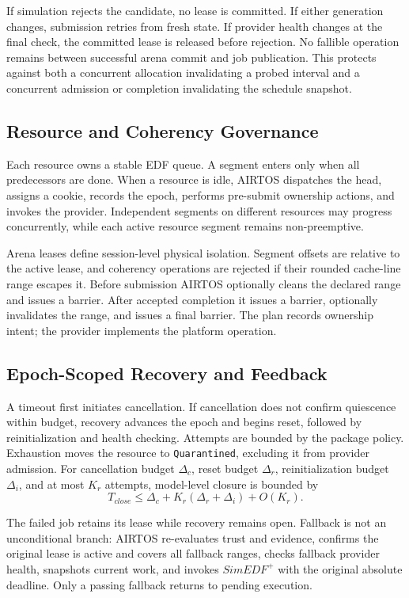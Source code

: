 \documentclass[lettersize,journal]{IEEEtran}
\begin{document}
If simulation rejects the candidate, no lease is committed. If either
generation changes, submission retries from fresh state. If provider health
changes at the final check, the committed lease is released before rejection.
No fallible operation remains between successful arena commit and job
publication. This protects against both a concurrent allocation invalidating a
probed interval and a concurrent admission or completion invalidating the
schedule snapshot.

\subsection{Resource and Coherency Governance}
Each resource owns a stable EDF queue. A segment enters only when all
predecessors are done. When a resource is idle, AIRTOS dispatches the head,
assigns a cookie, records the epoch, performs pre-submit ownership actions, and
invokes the provider. Independent segments on different resources may progress
concurrently, while each active resource segment remains non-preemptive.

Arena leases define session-level physical isolation. Segment offsets are
relative to the active lease, and coherency operations are rejected if their
rounded cache-line range escapes it. Before submission AIRTOS optionally cleans
the declared range and issues a barrier. After accepted completion it issues a
barrier, optionally invalidates the range, and issues a final barrier. The plan
records ownership intent; the provider implements the platform operation.

\subsection{Epoch-Scoped Recovery and Feedback}
A timeout first initiates cancellation. If cancellation does not confirm
quiescence within budget, recovery advances the epoch and begins reset,
followed by reinitialization and health checking. Attempts are bounded by the
package policy. Exhaustion moves the resource to \texttt{Quarantined}, excluding
it from provider admission. For cancellation budget $\Delta_c$, reset budget
$\Delta_r$, reinitialization budget $\Delta_i$, and at most $K_r$ attempts,
model-level closure is bounded by
\begin{equation}
T_{close}\le \Delta_c+K_r(\Delta_r+\Delta_i)+O(K_r).
\end{equation}

The failed job retains its lease while recovery remains open. Fallback is not
an unconditional branch: AIRTOS re-evaluates trust and evidence, confirms the
original lease is active and covers all fallback ranges, checks fallback
provider health, snapshots current work, and invokes $SimEDF^+$ with the
original absolute deadline. Only a passing fallback returns to pending
execution.
\end{document}
